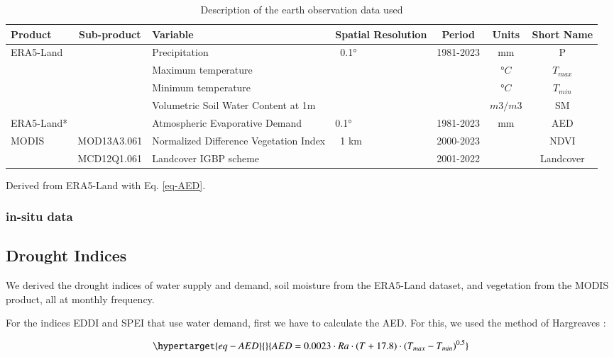 \documentclass[
  number,
  preprint,
  3p,
  onecolumn]{elsarticle}
\begin{document}
\begin{table}[!ht]
\caption{Description of the earth observation data used }
\label{tab-desEOD}
\small
\centering
\begin{tabular}{p{}cp{}p{}ccc}
\hline
\multirow{1}{*}{\centering Product} & Sub-product & Variable & Spatial Resolution  & Period & Units & Short Name \\ 
\hline
\multirow{4}{*}{ERA5-Land} & ~ & Precipitation & \multirow{4}{*}{~0.1°} & \multirow{4}{*}{1981-2023} & mm & P \\ 
         &  & Maximum temperature & ~ & & $°C$ & $T_{max}$ \\ 
         &  & Minimum temperature & ~ & & $°C$ & $T_{min}$ \\ 
         &  & Volumetric Soil Water Content at 1m & ~ & & $m3/m3$ & SM \\ 
ERA5-Land* & & Atmospheric Evaporative Demand & 0.1° & 1981-2023 & mm & AED \\
        \multirow{2}{*}{MODIS} & MOD13A3.061 & Normalized Difference Vegetation Index & \multirow{2}{*}{~1 km} & 2000-2023 & ~ & NDVI \\ 
         & MCD12Q1.061 & Landcover IGBP scheme & & 2001-2022 & ~ & Landcover \\ 
\hline
\end{tabular}
{\raggedright *Derived from ERA5-Land with Eq. \ref{eq-AED}. \par}
\end{table}

\hypertarget{in-situ-data}{%
\subsubsection{in-situ data}\label{in-situ-data}}

\hypertarget{drought-indices}{%
\subsection{Drought Indices}\label{drought-indices}}

We derived the drought indices of water supply and demand, soil moisture
from the ERA5-Land dataset, and vegetation from the MODIS product, all
at monthly frequency.

For the indices EDDI and SPEI that use water demand, first we have to
calculate the AED. For this, we used the method of Hargreaves
\citep{Hargreaves1994}:

\begin{equation}\protect\hypertarget{eq-AED}{}{AED = 0.0023\cdot Ra\cdot (T+17.8)\cdot (T_{max}-T_{min})^{0.5}}\label{eq-AED}\end{equation}
\end{document}
